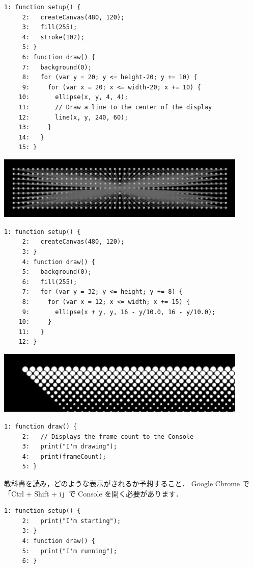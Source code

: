 \documentclass[a4j]{ltjsarticle}
\begin{document}
\begin{lstlisting}[caption=Ex\_04\_12.js]
     1: function setup() {
     2:   createCanvas(480, 120);
     3:   fill(255);
     4:   stroke(102);
     5: }
     6: function draw() {
     7:   background(0);
     8:   for (var y = 20; y <= height-20; y += 10) {
     9:     for (var x = 20; x <= width-20; x += 10) {
    10:       ellipse(x, y, 4, 4);
    11:       // Draw a line to the center of the display
    12:       line(x, y, 240, 60);
    13:     }
    14:   }
    15: }
\end{lstlisting}
\includegraphics[height=3cm]{image/Ex_04_12.pdf}
\begin{lstlisting}[caption=Ex\_04\_13.js]
     1: function setup() {
     2:   createCanvas(480, 120);
     3: }
     4: function draw() {
     5:   background(0);
     6:   fill(255);
     7:   for (var y = 32; y <= height; y += 8) {
     8:     for (var x = 12; x <= width; x += 15) {
     9:       ellipse(x + y, y, 16 - y/10.0, 16 - y/10.0);
    10:     }
    11:   }
    12: }
\end{lstlisting}
\includegraphics[height=3cm]{image/Ex_04_13.pdf}
\begin{lstlisting}[caption=Ex\_05\_01.js]
     1: function draw() {
     2:   // Displays the frame count to the Console
     3:   print("I'm drawing");
     4:   print(frameCount);
     5: }
\end{lstlisting}
教科書を読み，どのような表示がされるか予想すること．
Google Chrome で「Ctrl + Shift + i」で Console を開く必要があります．
\vspace{1in}
\begin{lstlisting}[caption=Ex\_05\_02.js]
     1: function setup() {
     2:   print("I'm starting");
     3: }
     4: function draw() {
     5:   print("I'm running");
     6: }
\end{lstlisting}
\vspace{1in}
\end{document}
